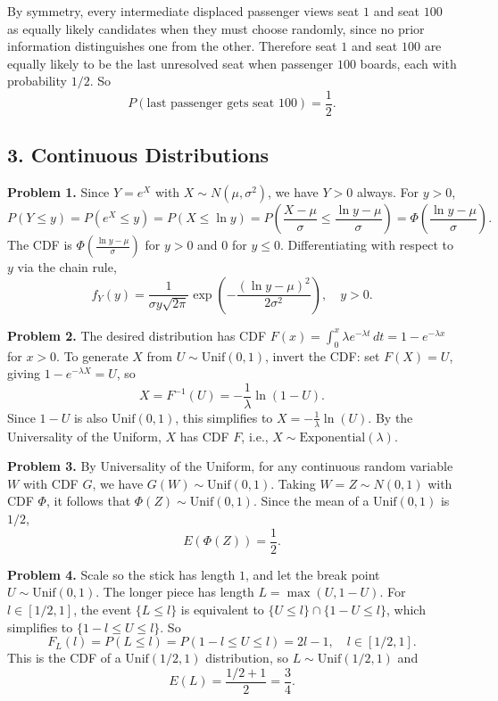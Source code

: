 \documentclass{article}
\begin{document}
By symmetry, every intermediate displaced passenger views seat $1$ and seat $100$ as equally likely candidates when they must choose randomly, since no prior information distinguishes one from the other. Therefore seat $1$ and seat $100$ are equally likely to be the last unresolved seat when passenger $100$ boards, each with probability $1/2$. So
$$
P(\text{last passenger gets seat } 100) = \frac{1}{2}.
$$

\subsection*{3. Continuous Distributions}

\textbf{Problem 1.} Since $Y=e^X$ with $X\sim N(\mu,\sigma^2)$, we have $Y>0$ always. For $y>0$,
$$
P(Y\le y) = P(e^X \le y) = P(X \le \ln y) = P\!\left(\frac{X-\mu}{\sigma}\le\frac{\ln y - \mu}{\sigma}\right) = \Phi\!\left(\frac{\ln y - \mu}{\sigma}\right).
$$
The CDF is $\Phi\!\left(\frac{\ln y-\mu}{\sigma}\right)$ for $y>0$ and $0$ for $y\le 0$. Differentiating with respect to $y$ via the chain rule,
$$
f_Y(y) = \frac{1}{\sigma y\sqrt{2\pi}}\exp\!\left(-\frac{(\ln y - \mu)^2}{2\sigma^2}\right), \quad y>0.
$$

\bigskip
\textbf{Problem 2.} The desired distribution has CDF $F(x)=\int_0^x \lambda e^{-\lambda t}\,dt = 1-e^{-\lambda x}$ for $x>0$. To generate $X$ from $U\sim\text{Unif}(0,1)$, invert the CDF: set $F(X)=U$, giving $1-e^{-\lambda X}=U$, so
$$
X = F^{-1}(U) = -\frac{1}{\lambda}\ln(1-U).
$$
Since $1-U$ is also $\text{Unif}(0,1)$, this simplifies to $X = -\frac{1}{\lambda}\ln(U)$. By the Universality of the Uniform, $X$ has CDF $F$, i.e., $X\sim\text{Exponential}(\lambda)$.

\bigskip
\textbf{Problem 3.} By Universality of the Uniform, for any continuous random variable $W$ with CDF $G$, we have $G(W)\sim\text{Unif}(0,1)$. Taking $W=Z\sim N(0,1)$ with CDF $\Phi$, it follows that $\Phi(Z)\sim\text{Unif}(0,1)$. Since the mean of a $\text{Unif}(0,1)$ is $1/2$,
$$
E(\Phi(Z)) = \frac{1}{2}.
$$

\bigskip
\textbf{Problem 4.} Scale so the stick has length $1$, and let the break point $U\sim\text{Unif}(0,1)$. The longer piece has length $L=\max(U,1-U)$. For $l\in[1/2,1]$, the event $\{L\le l\}$ is equivalent to $\{U\le l\}\cap\{1-U\le l\}$, which simplifies to $\{1-l\le U\le l\}$. So
$$
F_L(l) = P(L\le l) = P(1-l\le U\le l) = 2l-1, \quad l\in[1/2,1].
$$
This is the CDF of a $\text{Unif}(1/2,1)$ distribution, so $L\sim\text{Unif}(1/2,1)$ and
$$
E(L)=\frac{1/2+1}{2}=\frac{3}{4}.
$$
\end{document}
